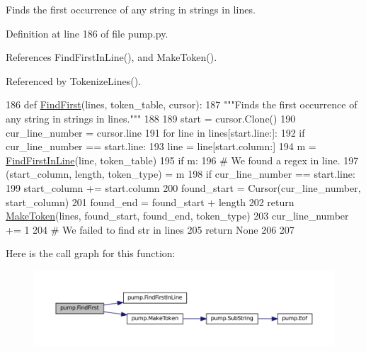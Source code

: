 \begin{DoxyVerb}Finds the first occurrence of any string in strings in lines.\end{DoxyVerb}
 

Definition at line 186 of file pump.\+py.



References Find\+First\+In\+Line(), and Make\+Token().



Referenced by Tokenize\+Lines().


\begin{DoxyCode}
186 \textcolor{keyword}{def }\hyperlink{namespacepump_a08f2d05c192d11a134c008287bafef07}{FindFirst}(lines, token\_table, cursor):
187   \textcolor{stringliteral}{"""Finds the first occurrence of any string in strings in lines."""}
188 
189   start = cursor.Clone()
190   cur\_line\_number = cursor.line
191   \textcolor{keywordflow}{for} line \textcolor{keywordflow}{in} lines[start.line:]:
192     \textcolor{keywordflow}{if} cur\_line\_number == start.line:
193       line = line[start.column:]
194     m = \hyperlink{namespacepump_af9f92ec64fe45399c7e051115a107ee7}{FindFirstInLine}(line, token\_table)
195     \textcolor{keywordflow}{if} m:
196       \textcolor{comment}{# We found a regex in line.}
197       (start\_column, length, token\_type) = m
198       \textcolor{keywordflow}{if} cur\_line\_number == start.line:
199         start\_column += start.column
200       found\_start = Cursor(cur\_line\_number, start\_column)
201       found\_end = found\_start + length
202       \textcolor{keywordflow}{return} \hyperlink{namespacepump_af96d60dc97b160f3a18e63857aabeef7}{MakeToken}(lines, found\_start, found\_end, token\_type)
203     cur\_line\_number += 1
204   \textcolor{comment}{# We failed to find str in lines}
205   \textcolor{keywordflow}{return} \textcolor{keywordtype}{None}
206 
207 
\end{DoxyCode}
Here is the call graph for this function\+:
\nopagebreak
\begin{figure}[H]
\begin{center}
\leavevmode
\includegraphics[width=350pt]{namespacepump_a08f2d05c192d11a134c008287bafef07_cgraph}
\end{center}
\end{figure}
